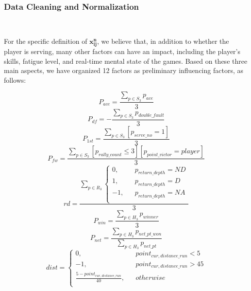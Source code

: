 \subsubsection{Data Cleaning and Normalization}~{}

For the specific definition of $\boldsymbol{x_{ij}^{n}}$, we believe that, 
in addition to whether the player is serving, many other factors can have an impact,
including the player's skills, fatigue level, and real-time mental state of the games.
Based on these three main aspects, 
we have organized 12 factors as preliminary influencing factors, as follows:

\begin{equation}
    P_{ace} = \frac{\sum_{p \in S_3} p_{ace}}{3}
\end{equation}
\begin{equation}
    P_{df} = -\frac{\sum_{p \in S_3} p_{double\_fault}}{3}
\end{equation}
\begin{equation}
    P_{1st} = \frac{\sum_{p \in S_3} [p_{serve\_no} = 1]}{3}
\end{equation}
\begin{equation}
    P_{fw} = \frac{\sum_{p \in S_3} [p_{rally\_count} \le 3] [p_{point\_victor} = player]}{3}
\end{equation}
\begin{equation}
    rd = \frac{\sum_{p \in R_3} \left\{
        \begin{aligned}
        0, && p_{return\_depth} = ND \\
        1, && p_{return\_depth} = D \\
        -1, && p_{return\_depth} = NA \\
        \end{aligned}
        \right.}{3}
\end{equation}
\begin{equation}
    P_{win} = \frac{\sum_{p \in H_3} p_{winner}}{3}
\end{equation}
\begin{equation}
    P_{net} = \frac{\sum_{p \in H_3} p_{net\_pt\_won}}{\sum_{p \in H_3} p_{net\_pt}}
\end{equation}
\begin{equation}
    dist = \left\{
        \begin{aligned}
        0, && point_{cur, distance\_run} < 5 \\
        -1, && point_{cur, distance\_run} > 45 \\
        \frac{5 - point_{cur, distance\_run}}{40}, && otherwise \\
        \end{aligned}
        \right.
\end{equation}
